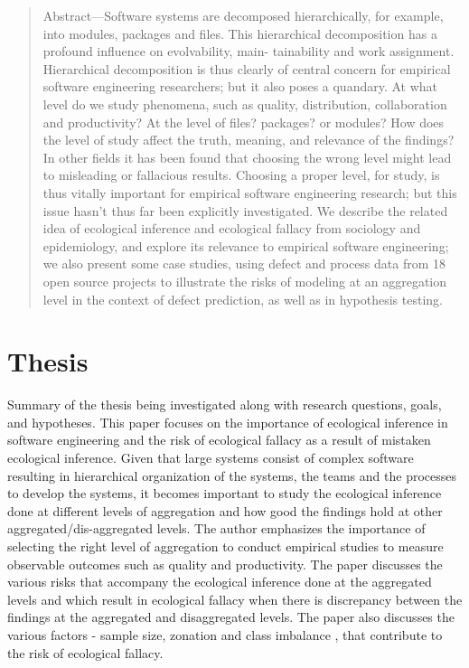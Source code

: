 \documentclass[12pt]{article}
\begin{document}
\maketitle

\begin{abstract}
Abstract—Software systems are decomposed hierarchically, for
example, into modules, packages and files. This hierarchical
decomposition has a profound influence on evolvability, main-
tainability and work assignment. Hierarchical decomposition is
thus clearly of central concern for empirical software engineering
researchers; but it also poses a quandary. At what level do we
study phenomena, such as quality, distribution, collaboration and
productivity? At the level of files? packages? or modules? How
does the level of study affect the truth, meaning, and relevance
of the findings? In other fields it has been found that choosing
the wrong level might lead to misleading or fallacious results.
Choosing a proper level, for study, is thus vitally important for
empirical software engineering research; but this issue hasn’t
thus far been explicitly investigated. We describe the related idea
of ecological inference and ecological fallacy from sociology and
epidemiology, and explore its relevance to empirical software
engineering; we also present some case studies, using defect and
process data from 18 open source projects to illustrate the risks
of modeling at an aggregation level in the context of defect
prediction, as well as in hypothesis testing.
\end{abstract}

\section{Thesis}\label{thesis}
Summary of the thesis being investigated along with research questions, goals, and hypotheses.
This paper focuses on the importance of ecological inference in software engineering and the risk of ecological fallacy as a result of mistaken ecological inference. Given that large systems consist of complex software
resulting in hierarchical organization of the systems, the teams and the processes to develop the systems, it becomes important to study the ecological inference
done at different levels of aggregation and how good the findings hold at other aggregated/dis-aggregated levels. The author emphasizes the importance of selecting the 
right level of aggregation to conduct empirical studies to measure observable outcomes such as quality and productivity. The paper discusses the various risks that accompany the 
ecological inference done at the aggregated levels and which result in ecological fallacy when there is discrepancy between the findings at the aggregated and disaggregated levels. The
paper also discusses the various factors - sample size, zonation and class imbalance , that contribute to the risk of ecological fallacy.
\end{document}
